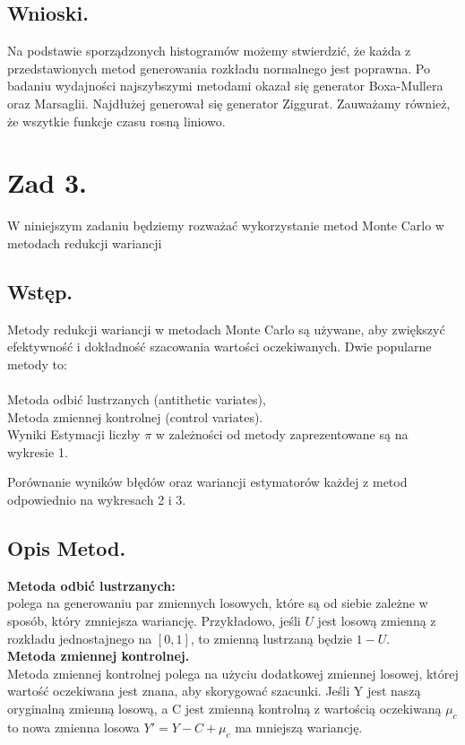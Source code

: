 \documentclass[12pt,letterpaper]{article}
\theoremstyle{definition}
\begin{document}
\subsection{Wnioski.}
Na podstawie sporządzonych histogramów możemy stwierdzić, że każda z przedstawionych metod generowania rozkładu normalnego jest poprawna. Po badaniu wydajności najszybszymi metodami okazał się generator Boxa-Mullera oraz Marsaglii. Najdłużej generował się generator Ziggurat. Zauważamy również, że wszytkie funkcje czasu rosną liniowo.

\section{Zad 3.}
W niniejszym zadaniu będziemy rozważać wykorzystanie metod Monte Carlo w metodach redukcji wariancji

\subsection{Wstęp.}
Metody redukcji wariancji w metodach Monte Carlo są używane, aby zwiększyć efektywność i dokładność szacowania wartości oczekiwanych. Dwie popularne metody to:\\
\\
Metoda odbić lustrzanych (antithetic variates),\\
Metoda zmiennej kontrolnej (control variates).\\

Wyniki Estymacji liczby $\pi$ w zależności od metody zaprezentowane są na wykresie 1.

Porównanie wyników błędów oraz wariancji estymatorów każdej z metod odpowiednio na wykresach 2 i 3.

\subsection{Opis Metod.}


\textbf{Metoda odbić lustrzanych:}\\
polega na generowaniu par zmiennych losowych, które są od siebie zależne w sposób, który zmniejsza wariancję. Przykładowo, jeśli $U$ jest losową zmienną z rozkładu jednostajnego na $[0,1]$, to zmienną lustrzaną będzie $1-U$.\\


\textbf{Metoda zmiennej kontrolnej.}\\
Metoda zmiennej kontrolnej polega na użyciu dodatkowej zmiennej losowej, której wartość oczekiwana jest znana, aby skorygować szacunki. Jeśli 
Y jest naszą oryginalną zmienną losową, a 
C jest zmienną kontrolną z wartością oczekiwaną $\mu_c $ to nowa zmienna losowa $Y' = Y -C +\mu_c$ ma mniejszą wariancję.
\end{document}
